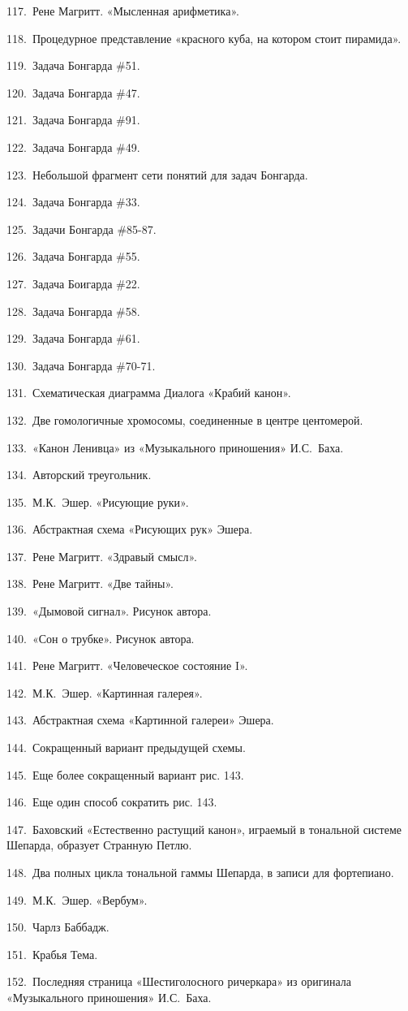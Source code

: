\documentclass[../main.tex]{subfiles}
\begin{document}
117.~Рене Магритт. «Мысленная арифметика».

118.~Процедурное представление «красного куба, на котором стоит пирамида».

119.~Задача Бонгарда \#51.

120.~Задача Бонгарда \#47.

121.~Задача Бонгарда \#91.

122.~Задача Бонгарда \#49.

123.~Небольшой фрагмент сети понятий для задач Бонгарда.

124.~Задача Бонгарда \#33.

125.~Задачи Бонгарда \#85-87.

126.~Задача Бонгарда \#55.

127.~Задача Боигарда \#22.

128.~Задача Бонгарда \#58.

129.~Задача Бонгарда \#61.

130.~Задача Бонгарда \#70-71.

131.~Схематическая диаграмма Диалога «Крабий канон».

132.~Две гомологичные хромосомы, соединенные в центре центомерой.

133.~«Канон Ленивца» из «Музыкального приношения» И.С.~Баха.

134.~Авторский треугольник.

135.~М.К.~Эшер. «Рисующие руки».

136.~Абстрактная схема «Рисующих рук» Эшера.

137.~Рене Магритт. «Здравый смысл».

138.~Рене Магритт. «Две тайны».

139.~«Дымовой сигнал». Рисунок автора.

140.~«Сон о трубке». Рисунок автора.

141.~Рене Магритт. «Человеческое состояние I».

142.~М.К.~Эшер. «Картинная галерея».

143.~Абстрактная схема «Картинной галереи» Эшера.

144.~Сокращенный вариант предыдущей схемы.

145.~Еще более сокращенный вариант рис. 143.

146.~Еще один способ сократить рис. 143.

147.~Баховский «Естественно растущий канон», играемый в тональной системе Шепарда, образует Странную Петлю.

148.~Два полных цикла тональной гаммы Шепарда, в записи для фортепиано.

149.~М.К.~Эшер. «Вербум».

150.~Чарлз Баббадж.

151.~Крабья Тема.

152.~Последняя страница «Шестиголосного ричеркара» из оригинала «Музыкального приношения» И.С.~Баха.
\end{document}
